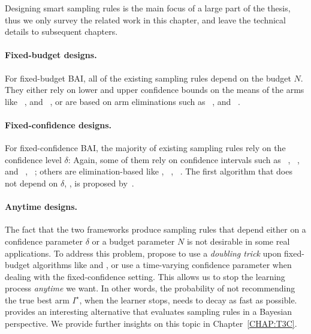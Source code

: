 Designing smart sampling rules is the main focus of a large part of the thesis, thus we only survey the related work in this chapter, and leave the technical details to subsequent chapters.

\paragraph{Fixed-budget designs.}

For fixed-budget BAI, all of the existing sampling rules depend on the budget $N$. They either rely on lower and upper confidence bounds on the means of the arms like \UCBE~\citep{audibert2010budget}, and \UGapE~\citep{gabillon2012ugape}, or are based on arm eliminations such as \SR~\citep{audibert2010budget}, and \SHA~\citep{karnin2013sha}.

\paragraph{Fixed-confidence designs.}

For fixed-confidence BAI, the majority of existing sampling rules rely on the confidence level $\delta$: Again, some of them rely on confidence intervals such as \LUCB~\citep{kalyanakrishnan2012lucb}, \UGapE~\citep{gabillon2012ugape}, \KLLUCB and \KLRacing~\citep{kaufmann2013kl}, \LIL~\citep{jamieson2014lilucb}; others are elimination-based like \SE, \ME~\citep{even-dar2003confidence}, \EGE~\citep{karnin2013sha}. The first algorithm that does not depend on $\delta$, \Track, is proposed by~\cite{garivier2016tracknstop}.

\paragraph{Anytime designs.}

The fact that the two frameworks produce sampling rules that depend either on a confidence parameter $\delta$ or a budget parameter $N$ is not desirable in some real applications. To address this problem, \cite{jun2016atlucb} propose to use a \emph{doubling trick} upon fixed-budget algorithms like \SR and \SHA, or use a time-varying confidence parameter when dealing with the fixed-confidence setting. This allows us to stop the learning process \emph{anytime} we want. In other words, the probability of not recommending the true best arm $I^\star$, when the learner stops, needs to decay as fast as possible. \cite{russo2016ttts} provides an interesting alternative that evaluates sampling rules in a Bayesian perspective. We provide further insights on this topic in Chapter~\ref{CHAP:T3C}. %

